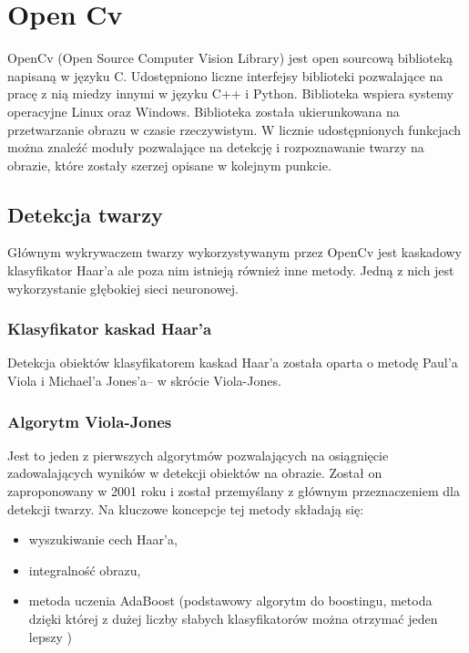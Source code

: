 \section{Open Cv}
OpenCv (Open Source Computer Vision Library) jest open sourcową biblioteką napisaną w języku C. Udostępniono liczne interfejsy biblioteki pozwalające na pracę z nią miedzy innymi w języku C++ i Python. Biblioteka wspiera systemy operacyjne Linux oraz Windows. Biblioteka została ukierunkowana na przetwarzanie obrazu w czasie rzeczywistym. W licznie udostępnionych funkcjach można znaleźć moduły pozwalające na detekcję i rozpoznawanie twarzy na obrazie, które zostały szerzej opisane w kolejnym punkcie.

\subsection{Detekcja twarzy}
Głównym wykrywaczem twarzy wykorzystywanym przez OpenCv jest kaskadowy klasyfikator Haar'a ale poza nim istnieją również inne metody. Jedną z nich jest wykorzystanie głębokiej sieci neuronowej.

\subsubsection{Klasyfikator kaskad Haar'a} \label{haar}
Detekcja obiektów klasyfikatorem kaskad Haar'a została oparta o metodę Paul'a Viola i Michael'a Jones'a– w skrócie Viola-Jones.

\subsubsection{Algorytm Viola-Jones}
Jest to jeden z pierwszych algorytmów pozwalających na osiągnięcie zadowalających wyników w detekcji obiektów na obrazie. Został on zaproponowany w 2001 roku i został przemyślany z głównym przeznaczeniem dla detekcji twarzy. Na kluczowe koncepcje tej metody składają się:
\begin{itemize}
\item wyszukiwanie cech Haar'a,
\item integralność obrazu,
\item metoda uczenia AdaBoost (podstawowy algorytm do boostingu, metoda dzięki której z dużej liczby słabych klasyfikatorów można otrzymać jeden lepszy )
\end{itemize}

